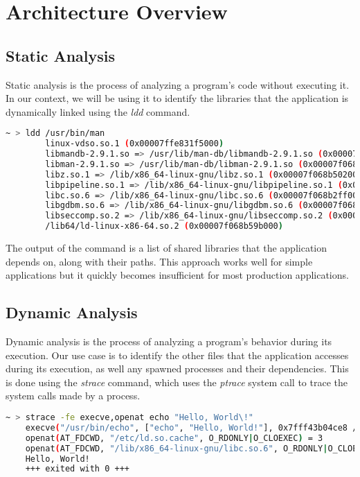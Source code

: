 \chapter{Architecture Overview}
\label{chapter:architecture}

\section{Static Analysis}
\label{sec:static-analysis}

Static analysis is the process of analyzing a program's code without executing it. In our context, we will be using it
to identify the libraries that the application is dynamically linked using the \textit{ldd} command.
\begin{lstlisting}[language=bash, caption=ldd command, label=lst:ex-ldd]
    ~ > ldd /usr/bin/man
        linux-vdso.so.1 (0x00007ffe831f5000)
        libmandb-2.9.1.so => /usr/lib/man-db/libmandb-2.9.1.so (0x00007f068b572000)
        libman-2.9.1.so => /usr/lib/man-db/libman-2.9.1.so (0x00007f068b52f000)
        libz.so.1 => /lib/x86_64-linux-gnu/libz.so.1 (0x00007f068b502000)
        libpipeline.so.1 => /lib/x86_64-linux-gnu/libpipeline.so.1 (0x00007f068b4f1000)
        libc.so.6 => /lib/x86_64-linux-gnu/libc.so.6 (0x00007f068b2ff000)
        libgdbm.so.6 => /lib/x86_64-linux-gnu/libgdbm.so.6 (0x00007f068b2ef000)
        libseccomp.so.2 => /lib/x86_64-linux-gnu/libseccomp.so.2 (0x00007f068b2cb000)
        /lib64/ld-linux-x86-64.so.2 (0x00007f068b59b000)
\end{lstlisting}

The output of the command is a list of shared libraries that the application depends on, along with their paths.
This approach works well for simple applications but it quickly becomes insufficient for most production applications.

\section{Dynamic Analysis}
\label{sec:dynamic-analysis}

Dynamic analysis is the process of analyzing a program's behavior during its execution. Our use case is to identify the other files 
that the application accesses during its execution, as well any spawned processes and their dependencies.
This is done using the \textit{strace} command, which uses the \textit{ptrace} system call to trace the system calls made by a process.
\begin{lstlisting}[language=bash, caption=strace command, label=lst:ex-strace]
    ~ > strace -fe execve,openat echo "Hello, World\!"
    execve("/usr/bin/echo", ["echo", "Hello, World!"], 0x7fff43b04ce8 /* 36 vars */) = 0
    openat(AT_FDCWD, "/etc/ld.so.cache", O_RDONLY|O_CLOEXEC) = 3
    openat(AT_FDCWD, "/lib/x86_64-linux-gnu/libc.so.6", O_RDONLY|O_CLOEXEC) = 3
    Hello, World!
    +++ exited with 0 +++
\end{lstlisting}

